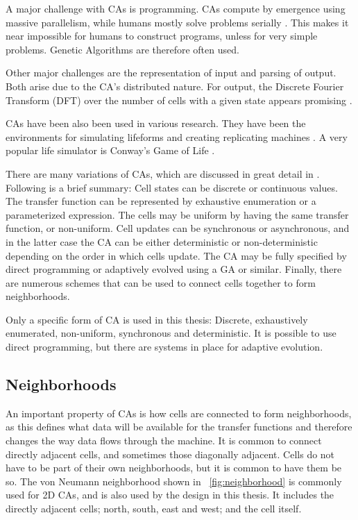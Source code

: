 A major challenge with CAs is programming.
CAs compute by emergence using massive parallelism, while humans mostly solve problems serially \cite{newell1972problemsolving}.
This makes it near impossible for humans to construct programs, unless for very simple problems.
Genetic Algorithms are therefore often used.

Other major challenges are the representation of input and parsing of output.
Both arise due to the CA's distributed nature.
For output, the Discrete Fourier Transform (DFT) over the number of cells with a given state appears promising \cite{berg2013ca}.

CAs have been also been used in various research.
They have been the environments for simulating lifeforms and creating replicating machines \cite{neumann1966selfreplication}.
A very popular life simulator is Conway's Game of Life \cite{gardner1970life}.

There are many variations of CAs, which are discussed in great detail in \cite{sipper1999emergence}.
Following is a brief summary:
Cell states can be discrete or continuous values.
The transfer function can be represented by exhaustive enumeration or a parameterized expression.
The cells may be uniform by having the same transfer function, or non-uniform.
Cell updates can be synchronous or asynchronous, and in the latter case the CA can be either deterministic or non-deterministic depending on the order in which cells update.
The CA may be fully specified by direct programming or adaptively evolved using a GA or similar.
Finally, there are numerous schemes that can be used to connect cells together to form neighborhoods.

Only a specific form of CA is used in this thesis:
Discrete, exhaustively enumerated, non-uniform, synchronous and deterministic.
It is possible to use direct programming, but there are systems in place for adaptive evolution.

\subsection{Neighborhoods}

An important property of CAs is how cells are connected to form neighborhoods, as this defines what data will be available for the transfer functions and therefore changes the way data flows through the machine.
It is common to connect directly adjacent cells, and sometimes those diagonally adjacent.
Cells do not have to be part of their own neighborhoods, but it is common to have them be so.
The von Neumann neighborhood shown in \figurename~\ref{fig:neighborhood} is commonly used for 2D CAs, and is also used by the design in this thesis.
It includes the directly adjacent cells; north, south, east and west; and the cell itself.

